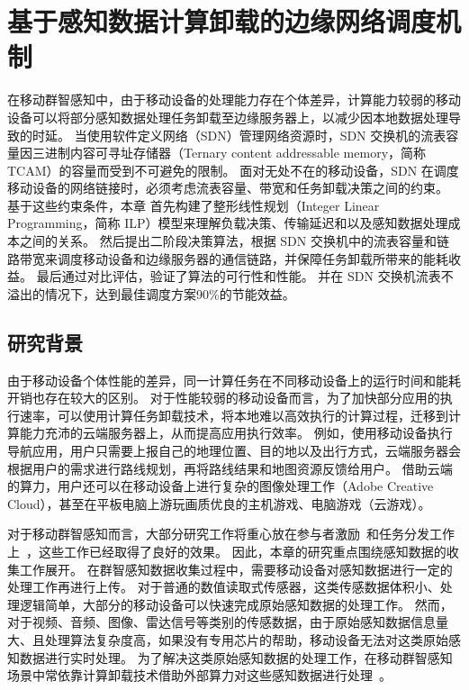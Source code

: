 \chapter{基于感知数据计算卸载的边缘网络调度机制}

在移动群智感知中，由于移动设备的处理能力存在个体差异，计算能力较弱的移动设备可以将部分感知数据处理任务卸载至边缘服务器上，以减少因本地数据处理导致的时延。
当使用软件定义网络（SDN）管理网络资源时，SDN 交换机的流表容量因三进制内容可寻址存储器（Ternary content addressable memory，简称 TCAM）的容量而受到不可避免的限制。
面对无处不在的移动设备，SDN 在调度移动设备的网络链接时，必须考虑流表容量、带宽和任务卸载决策之间的约束。
基于这些约束条件，本章 首先构建了整形线性规划（Integer Linear Programming，简称 ILP）模型来理解负载决策、传输延迟和以及感知数据处理成本之间的关系。
然后提出二阶段决策算法，根据 SDN 交换机中的流表容量和链路带宽来调度移动设备和边缘服务器的通信链路，并保障任务卸载所带来的能耗收益。
最后通过对比评估，验证了算法的可行性和性能。
并在 SDN 交换机流表不溢出的情况下，达到最佳调度方案90\%的节能效益。

\section{研究背景}

由于移动设备个体性能的差异，同一计算任务在不同移动设备上的运行时间和能耗开销也存在较大的区别。
对于性能较弱的移动设备而言，为了加快部分应用的执行速率，可以使用计算任务卸载技术，将本地难以高效执行的计算过程，迁移到计算能力充沛的云端服务器上，从而提高应用执行效率。
例如，使用移动设备执行导航应用，用户只需要上报自己的地理位置、目的地以及出行方式，云端服务器会根据用户的需求进行路线规划，再将路线结果和地图资源反馈给用户。
借助云端的算力，用户还可以在移动设备上进行复杂的图像处理工作（Adobe Creative Cloud），甚至在平板电脑上游玩画质优良的主机游戏、电脑游戏（云游戏）。

对于移动群智感知而言，大部分研究工作将重心放在参与者激励~\cite{CNKI:JiaChaopeng, DBLP:journals/comsur/ZhangYSLTXM16, CNKI:WuMCSIncentive}和任务分发工作上~\cite{DBLP:conf/huc/LiuGWWYZ16, DBLP:conf/infocom/Xiao0HWL15, DBLP:conf/mass/LiLW15}，这些工作已经取得了良好的效果。
因此，本章的研究重点围绕感知数据的收集工作展开。
在群智感知数据收集过程中，需要移动设备对感知数据进行一定的处理工作再进行上传。
对于普通的数值读取式传感器，这类传感数据体积小、处理逻辑简单，大部分的移动设备可以快速完成原始感知数据的处理工作。
然而，对于视频、音频、图像、雷达信号等类别的传感数据，由于原始感知数据信息量大、且处理算法复杂度高，如果没有专用芯片的帮助，移动设备无法对这类原始感知数据进行实时处理。
为了解决这类原始感知数据的处理工作，在移动群智感知场景中常依靠计算卸载技术借助外部算力对这些感知数据进行处理~\cite{Lee:2013fj, Linthicum:2017vv, Kumar:2013dq}。

